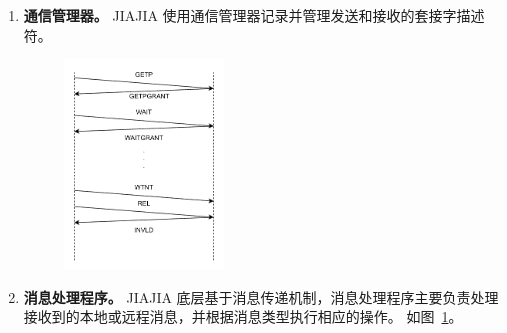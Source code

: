 {\begin{enumerate}[label=\arabic*.]
        \item \textbf{通信管理器。} JIAJIA 使用通信管理器记录并管理发送和接收的套接字描述符。

              \begin{figure}[!htbp]
                  \centering
                  \includegraphics[width=0.4\textwidth]{Img/JIAJIA底层消息传递机制.drawio.pdf}
                  \label{fig:JIAJIA-message-handle}
              \end{figure}
        \item \textbf{消息处理程序。} JIAJIA 底层基于消息传递机制，消息处理程序主要负责处理接收到的本地或远程消息，并根据消息类型执行相应的操作。
              如图~\ref{fig:JIAJIA-message-handle}。


\end{enumerate}}
